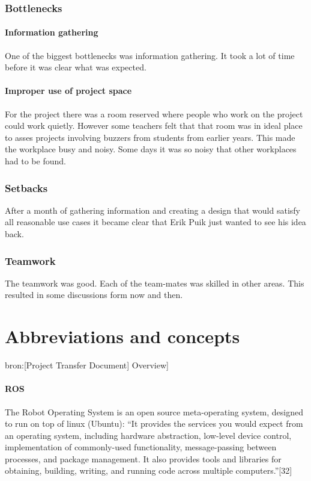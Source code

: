 \documentclass[12pt,a4paper]{report}
\begin{document}
\subsection{Bottlenecks}
\subsubsection{Information gathering}
One of the biggest bottlenecks was information gathering.
It took a lot of time before it was clear what was expected.

\subsubsection{Improper use of project space}
For the project there was a room reserved where people who work on the project could work quietly.
However some teachers felt that that room was in ideal place to asses projects involving buzzers from students from earlier years.
This made the workplace busy and noisy.
Some days it was so noisy that other workplaces had to be found.

\subsection{Setbacks}
After a month of gathering information and creating a design that would satisfy all reasonable use cases it became clear that Erik Puik just wanted to see his idea back.

\subsection{Teamwork}
The teamwork was good. 
Each of the team-mates was skilled in other areas.
This resulted in some discussions form now and then.

\chapter{Abbreviations and concepts}
bron:[Project Transfer Document] Overview]
\subsubsection{ROS}
The Robot Operating System is an open source meta-operating system, designed to run on top of linux (Ubuntu): “It provides the services you would expect from an operating system, including hardware abstraction, low-level device control, implementation of commonly-used functionality, message-passing between processes, and package management. It also provides tools and libraries for obtaining, building, writing, and running code across multiple computers.”[32]
\end{document}
